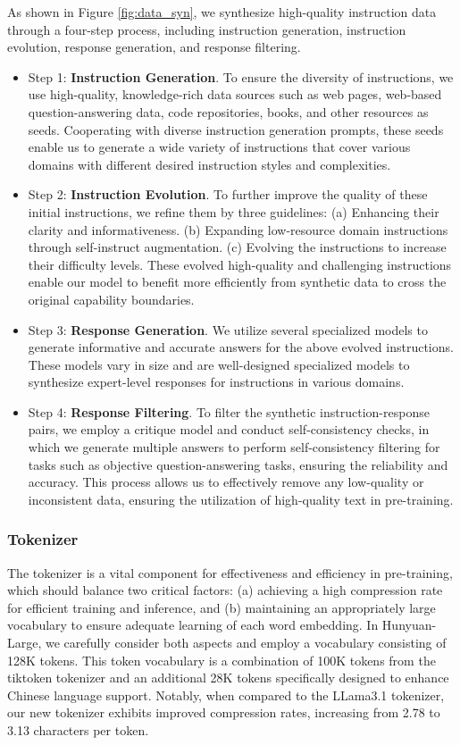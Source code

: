 \documentclass{article}
\begin{document}
As shown in Figure \ref{fig:data_syn}, we synthesize high-quality instruction data through a four-step process, including instruction generation, instruction evolution, response generation, and response filtering.
\begin{itemize}[leftmargin=10pt]
    \item Step 1: \textbf{Instruction Generation}. To ensure the diversity of instructions, we use high-quality, knowledge-rich data sources such as web pages, web-based question-answering data, code repositories, books, and other resources as seeds. Cooperating with diverse instruction generation prompts, these seeds enable us to generate a wide variety of instructions that cover various domains with different desired instruction styles and complexities.
    \item Step 2: \textbf{Instruction Evolution}. To further improve the quality of these initial instructions, we refine them by three guidelines: (a) Enhancing their clarity and informativeness. (b) Expanding low-resource domain instructions through self-instruct augmentation. (c) Evolving the instructions to increase their difficulty levels. These evolved high-quality and challenging instructions enable our model to benefit more efficiently from synthetic data to cross the original capability boundaries.
    \item Step 3: \textbf{Response Generation}. We utilize several specialized models to generate informative and accurate answers for the above evolved instructions. These models vary in size and are well-designed specialized models to synthesize expert-level responses for instructions in various domains.
    \item Step 4: \textbf{Response Filtering}. To filter the synthetic instruction-response pairs, we employ a critique model and conduct self-consistency checks, in which we generate multiple answers to perform self-consistency filtering for tasks such as objective question-answering tasks, ensuring the reliability and accuracy. This process allows us to effectively remove any low-quality or inconsistent data, ensuring the utilization of high-quality text in pre-training.

\end{itemize}

\subsubsection{Tokenizer}
The tokenizer is a vital component for effectiveness and efficiency in pre-training, which should balance two critical factors: (a) achieving a high compression rate for efficient training and inference, and (b) maintaining an appropriately large vocabulary to ensure adequate learning of each word embedding. 
In Hunyuan-Large, we carefully consider both aspects and employ a vocabulary consisting of 128K tokens. This token vocabulary is a combination of 100K tokens from the tiktoken tokenizer \citep{OpenAI2022Tiktoken} and an additional 28K tokens specifically designed to enhance Chinese language support. Notably, when compared to the LLama3.1 tokenizer, our new tokenizer exhibits improved compression rates, increasing from 2.78 to 3.13 characters per token.
\end{document}
